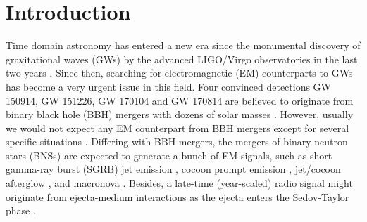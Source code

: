 \documentclass{emulateapj}
\begin{document}

\section{Introduction}
Time domain astronomy has entered a new era since the monumental discovery of gravitational waves (GWs) by the advanced LIGO/Virgo observatories in the last two years \citep{abb16a,abb16b,abb17a,abb17b}. Since then, searching for electromagnetic (EM) counterparts to GWs has become a very urgent issue in this field. Four convinced detections GW 150914, GW 151226, GW 170104 and GW 170814 are believed to originate from binary black hole (BBH) mergers with dozens of solar masses \citep{abb16a,abb16b,abb17a,abb17b}. However, usually we would not expect any EM counterpart from BBH mergers except for several specific situations \citep{con16, loeb16, per16, yam16, zhang16, demi17}. Differing with BBH mergers, the mergers of binary neutron stars (BNSs) are expected to generate a bunch of EM signals, such as short gamma-ray burst (SGRB) jet emission \citep[e.g.][]{fab06, nak07, gia13, ber14, ruiz16, kath17}, cocoon prompt emission \citep{got17, laz17a, laz17b, nak17}, jet/cocoon afterglow \citep[e.g.][]{got17, lamb17, laz17a, nak17}, and macronova \citep{li98, met10, met12, kas13, hot15, got17, nak17}. Besides, a late-time (year-scaled) radio signal might originate from ejecta-medium interactions as the ejecta enters the Sedov-Taylor phase \citep{nak11}.
\end{document}
